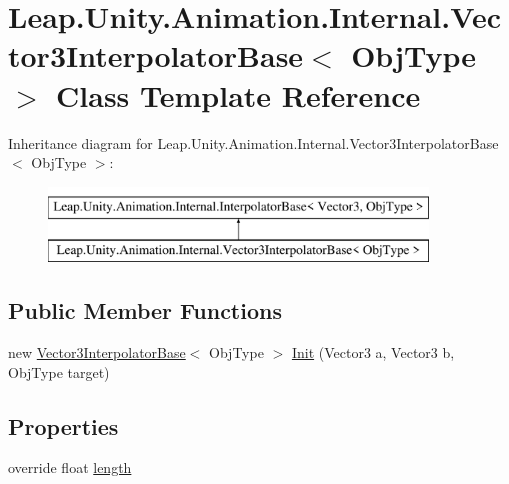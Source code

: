 \hypertarget{class_leap_1_1_unity_1_1_animation_1_1_internal_1_1_vector3_interpolator_base}{}\section{Leap.\+Unity.\+Animation.\+Internal.\+Vector3\+Interpolator\+Base$<$ Obj\+Type $>$ Class Template Reference}
\label{class_leap_1_1_unity_1_1_animation_1_1_internal_1_1_vector3_interpolator_base}
Inheritance diagram for Leap.\+Unity.\+Animation.\+Internal.\+Vector3\+Interpolator\+Base$<$ Obj\+Type $>$\+:\begin{figure}[H]
\begin{center}
\leavevmode
\includegraphics[height=2.000000cm]{class_leap_1_1_unity_1_1_animation_1_1_internal_1_1_vector3_interpolator_base}
\end{center}
\end{figure}
\subsection*{Public Member Functions}
\begin{DoxyCompactItemize}
\item 
new \mbox{\hyperlink{class_leap_1_1_unity_1_1_animation_1_1_internal_1_1_vector3_interpolator_base}{Vector3\+Interpolator\+Base}}$<$ Obj\+Type $>$ \mbox{\hyperlink{class_leap_1_1_unity_1_1_animation_1_1_internal_1_1_vector3_interpolator_base_ad7c573adfc7a5519fbb6904097c5d25d}{Init}} (Vector3 a, Vector3 b, Obj\+Type target)
\end{DoxyCompactItemize}
\subsection*{Properties}
\begin{DoxyCompactItemize}
\item 
override float \mbox{\hyperlink{class_leap_1_1_unity_1_1_animation_1_1_internal_1_1_vector3_interpolator_base_add65a660f3d6172838b808b6bff4fd55}{length}}
\end{DoxyCompactItemize}
